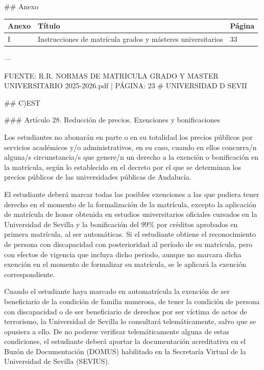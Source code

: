 \documentclass{article}
\begin{document}
\begin{itemize}
\begin{itemize}
\begin{scriptsize}
                  \#\# Anexo

                  \vspace{0.4cm}
                  \begin{table}[h!]\centering\renewcommand{\arraystretch}{1.3}
                    \begin{tabular}{|p{}|p{}|p{}|}\hline
                      Anexo & Título                                                      & Página \\\hline
                      I     & Instrucciones de matrícula grados y másteres universitarios & 33     \\\hline
                    \end{tabular}\end{table}
                  \vspace{0.4cm}

                  ---

                  FUENTE: R.R. NORMAS DE MATRICULA GRADO Y MASTER UNIVERSITARIO 2025-2026.pdf | PÁGINA: 23
                  \# UNIVERSIDAD D SEVII

                  \#\# C)EST

                  \#\#\# Artículo 28. Reducción de precios. Exenciones y bonificaciones

                  Los estudiantes no abonarán en parte o en su totalidad los precios públicos por servicios académicos y/o administrativos, en su caso, cuando en ellos concurra/n alguna/s circunstancia/s que genere/n un derecho a la exención o bonificación en la matrícula, según lo establecido en el decreto por el que se determinan los precios públicos de las universidades públicas de Andalucía.

                  El estudiante deberá marcar todas las posibles exenciones a las que pudiera tener derecho en el momento de la formalización de la matrícula, excepto la aplicación de matrícula de honor obtenida en estudios universitarios oficiales cursados en la Universidad de Sevilla y la bonificación del 99\% por créditos aprobados en primera matrícula, al ser automáticas. Si el estudiante obtiene el reconocimiento de persona con discapacidad con posterioridad al período de su matrícula, pero con efectos de vigencia que incluya dicho periodo, aunque no marcara dicha exención en el momento de formalizar su matrícula, se le aplicará la exención correspondiente.

                  Cuando el estudiante haya marcado en automatrícula la exención de ser beneficiario de la condición de familia numerosa, de tener la condición de persona con discapacidad o de ser beneficiario de derechos por ser víctima de actos de terrorismo, la Universidad de Sevilla lo consultará telemáticamente, salvo que se opusiera a ello. De no poderse verificar telemáticamente alguna de estas condiciones, el estudiante deberá aportar la documentación acreditativa en el Buzón de Documentación (DOMUS) habilitado en la Secretaría Virtual de la Universidad de Sevilla (SEVIUS).


\end{scriptsize}
\end{itemize}
\end{itemize}
\end{document}
